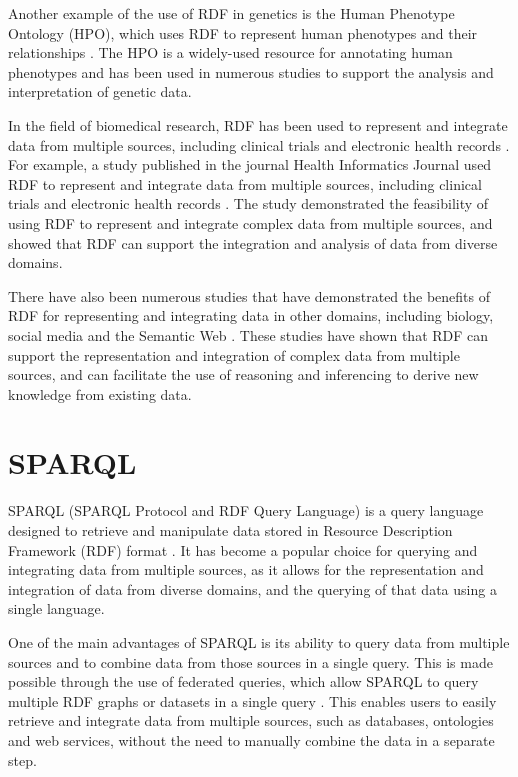 Another example of the use of RDF in genetics is the Human Phenotype Ontology (HPO), which uses RDF to represent human phenotypes and their relationships \citep*{robinson2010human}.  The HPO is a widely-used resource for annotating human phenotypes and has been used in numerous studies to support the analysis and interpretation of genetic data.

In the field of biomedical research, RDF has been used to represent and integrate data from multiple sources, including clinical trials and electronic health records \citep*{luz2015providing}.  For example, a study published in the journal Health Informatics Journal used RDF to represent and integrate data from multiple sources, including clinical trials and electronic health records \citep*{luz2015providing}.  The study demonstrated the feasibility of using RDF to represent and integrate complex data from multiple sources, and showed that RDF can support the integration and analysis of data from diverse domains.

There have also been numerous studies that have demonstrated the benefits of RDF for representing and integrating data in other domains, including biology, social media and the Semantic Web \citep*{schreiber2014rdf,allemang2011semantic,heath2011linked}.  These studies have shown that RDF can support the representation and integration of complex data from multiple sources, and can facilitate the use of reasoning and inferencing to derive new knowledge from existing data.

\section{SPARQL}

SPARQL (SPARQL Protocol and RDF Query Language) is a query language designed to retrieve and manipulate data stored in Resource Description Framework (RDF) format \citep*{prud2008sparql}.  It has become a popular choice for querying and integrating data from multiple sources, as it allows for the representation and integration of data from diverse domains, and the querying of that data using a single language.

One of the main advantages of SPARQL is its ability to query data from multiple sources and to combine data from those sources in a single query.  This is made possible through the use of federated queries, which allow SPARQL to query multiple RDF graphs or datasets in a single query \citetext{\citealp*{allemang2011semantic}; \citealp{rakhmawati2013querying}}.  This enables users to easily retrieve and integrate data from multiple sources, such as databases, ontologies and web services, without the need to manually combine the data in a separate step.

